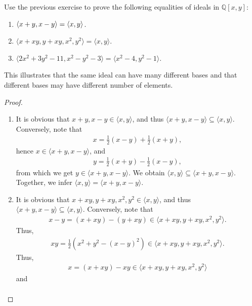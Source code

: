 \begin{exercise}{3}
    Use the previous exercise to prove the following equalities of ideals in $\mathbb{Q}[x,y]$:
    \begin{enumerate}
        \item $\langle x+y,x-y\rangle = \langle x,y\rangle$.
        \item $\langle x+xy, y+xy, x^2, y^2\rangle = \langle x,y\rangle$.
        \item $\langle 2x^2 + 3y^2 - 11, x^2 - y^2 - 3\rangle = \langle x^2 - 4, y^2 -1\rangle$.
    \end{enumerate}
    This illustrates that the same ideal can have many different bases and that different bases may have different number of elements.
\end{exercise}
\begin{proof}
    \begin{enumerate}
        \item It is obvious that $x+y, x-y\in \langle x,y\rangle$, and thus $\langle x+y,x-y\rangle \subseteq \langle x,y\rangle$. 
        Conversely, note that
        \begin{align*}
            x = \frac{1}{2}(x-y) + \frac{1}{2}(x+y),
        \end{align*}
        hence $x\in \langle x+y,x-y\rangle$, and
        \begin{align*}
            y = \frac{1}{2}(x+y) - \frac{1}{2}(x-y),
        \end{align*}
        from which we get $y\in \langle x+y,x-y\rangle$. We obtain $\langle x,y\rangle \subseteq \langle x+y,x-y\rangle$. Together, we infer $\langle x,y\rangle = \langle x+y,x-y\rangle$.
        \item It is obvious that $x+xy, y+xy, x^2, y^2\in \langle x,y\rangle$, and thus $\langle x+y,x-y\rangle \subseteq \langle x,y\rangle$. 
        Conversely, note that
        \begin{align*}
            x-y = (x+xy) - (y+xy)\in \langle x+xy, y+xy, x^2, y^2\rangle.
        \end{align*}
        Thus,
        \begin{align*}
            xy = \frac{1}{2}(x^2 + y^2 - (x-y)^2)\in \langle x+xy, y+xy, x^2, y^2\rangle.
        \end{align*}
        Thus,
        \begin{align*}
            x = (x+xy) - xy \in \langle x+xy, y+xy, x^2, y^2\rangle
        \end{align*}
        and
        \begin{align*}

\end{align*}
\end{enumerate}
\end{proof}
